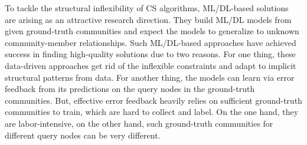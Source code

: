 \documentclass[conference]{IEEEtran}
\begin{document}
To tackle the structural inflexibility of CS algorithms, ML/DL-based
solutions~\cite{ICSGNN, AQDGNN} are arising as an attractive research
direction.  They build ML/DL models from given ground-truth
communities and expect the models to generalize to unknown
community-member relationships.
Such ML/DL-based approaches have achieved success in finding
high-quality solutions due to two reasons.  For one thing, these
data-driven approaches get rid of the inflexible constraints and adapt
to implicit structural patterns from data. For another thing, the
models can learn via error feedback from its predictions on the query
nodes in the ground-truth communities.
%
%
But, effective error feedback heavily relies on sufficient
ground-truth communities to train, which are hard to collect and
label. On the one hand, they are labor-intensive, on the other hand, such
ground-truth communities for different query nodes can be very
different.

\end{document}
